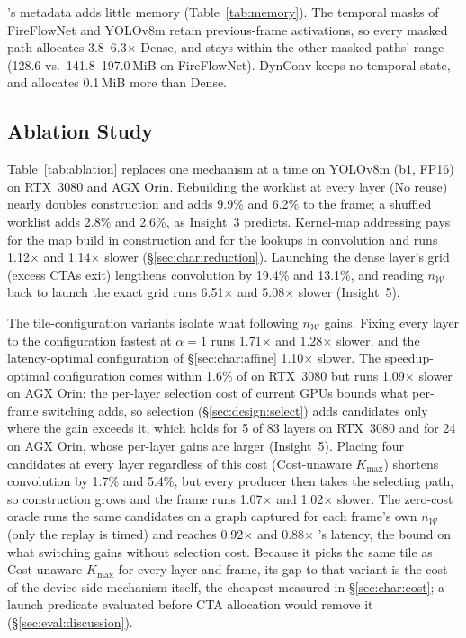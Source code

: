 \sysname's metadata adds little memory (Table~\ref{tab:memory}). The temporal
masks of FireFlowNet and YOLOv8m retain previous-frame activations, so
every masked path allocates 3.8--6.3$\times$ Dense, and \sysname stays within
the other masked paths' range (128.6 vs.\ 141.8--197.0\,MiB on
FireFlowNet). DynConv keeps no temporal state, and \sysname allocates
0.1\,MiB more than Dense.



\subsection{Ablation Study}
\label{sec:eval:ablation-sensitivity}



Table~\ref{tab:ablation} replaces one mechanism at a time on YOLOv8m (b1,
FP16) on RTX~3080 and AGX Orin. Rebuilding the worklist at every layer (No
reuse) nearly doubles construction and adds 9.9\% and 6.2\% to the frame; a
shuffled worklist adds 2.8\% and 2.6\%, as Insight~3 predicts. Kernel-map
addressing pays for the map build in construction and for the lookups in
convolution and runs 1.12$\times$ and 1.14$\times$ slower
(\S\ref{sec:char:reduction}). Launching the dense layer's grid (excess CTAs exit) lengthens convolution by 19.4\% and 13.1\%, and
reading $n_{\mathcal{W}}$ back to launch the exact grid runs 6.51$\times$ and
5.08$\times$ slower (Insight~5).

The tile-configuration variants isolate what following $n_{\mathcal{W}}$ gains. Fixing
every layer to the configuration fastest at $\alpha = 1$ runs 1.71$\times$ and
1.28$\times$ slower, and the latency-optimal configuration of
\S\ref{sec:char:affine} 1.10$\times$ slower. The speedup-optimal configuration
comes within 1.6\% of \sysname on RTX~3080 but runs 1.09$\times$ slower on
AGX Orin: the per-layer selection cost of current GPUs bounds what per-frame
switching adds, so selection (\S\ref{sec:design:select}) adds candidates only
where the gain exceeds it, which holds for 5 of 83
layers on RTX~3080 and for 24 on AGX Orin, whose per-layer gains are larger
(Insight~5). Placing four candidates at every layer regardless of this cost
(Cost-unaware $K_{\max}$) shortens convolution by 1.7\% and 5.4\%, but every
producer then takes the selecting path, so construction grows and the frame
runs 1.07$\times$ and 1.02$\times$ slower. The zero-cost oracle runs the same
candidates on a graph captured for each frame's own $n_{\mathcal{W}}$ (only the replay is
timed) and reaches 0.92$\times$ and 0.88$\times$ \sysname's latency, the bound on what
switching gains without selection cost. Because
it picks the same tile as Cost-unaware $K_{\max}$ for every layer and frame,
its gap to that variant is the cost of the device-side mechanism itself, the
cheapest measured in \S\ref{sec:char:cost}; a launch predicate evaluated
before CTA allocation would remove it (\S\ref{sec:eval:discussion}).

